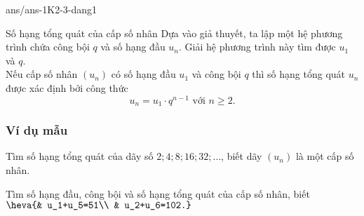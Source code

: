 \begin{indapan}{10}
	{ans/ans-1K2-3-dang1}
\end{indapan}
\begin{dang}{Số hạng tổng quát của cấp số nhân}
	Dựa vào giả thuyết, ta lập một hệ phương trình chứa công bội $ q $ và số hạng đầu $ u_n $. Giải hệ phương trình này tìm được $ u_1 $ và $ q $.\\
	Nếu cấp số nhân $ (u_n) $ có số hạng đầu $ u_1 $ và công bội $ q $ thì số hạng tổng quát $ u_n $ được xác định bởi công thức $$ u_n=u_1\cdot q^{n-1} \text{ với } n\ge 2. $$
\end{dang}
\subsubsection{Ví dụ mẫu}
\begin{vd}[NB]%
	Tìm số hạng tổng quát của dãy số $ 2;4;8;16;32;\ldots $, biết dãy $ (u_n) $ là một cấp số nhân.  
\end{vd}
\begin{vd}[TH]%
	Tìm số hạng đầu, công bội và số hạng tổng quát của cấp số nhân, biết $ \heva{& u_1+u_5=51\\ & u_2+u_6=102.} $
\end{vd}

